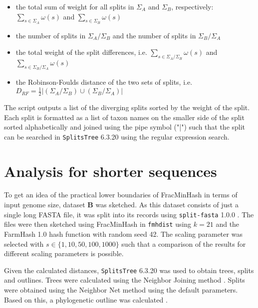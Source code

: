 \begin{itemize}
  \item the total sum of weight for all splits in $\Sigma_A$ and $\Sigma_B$,
  respectively: $\sum_{s \in \Sigma_A}{\omega(s)}$ and $\sum_{s \in
  \Sigma_B}{\omega(s)}$ 
  \item the number of splits in $\Sigma_A / \Sigma_B$ and the number of splits
  in $\Sigma_B / \Sigma_A$
  \item the total weight of the split differences, i.e.
  $\sum_{s \in \Sigma_A / \Sigma_B}{\omega(s)}$ and $\sum_{s \in \Sigma_B /
  \Sigma_A}{\omega(s)}$
  \item the Robinson-Foulds distance
  \cite{robinsonComparisonPhylogeneticTrees1981} of the two sets of splits, i.e.
  $D_{RF} = \frac{1}{2}|(\Sigma_A / \Sigma_B) \cup (\Sigma_B / \Sigma_A)|$
\end{itemize}

The script outputs a list of the diverging splits sorted by the weight of the
split. Each split is formatted as a list of taxon names on the smaller side of
the split sorted alphabetically and joined using the pipe symbol ("|") such that
the split can be searched in \texttt{SplitsTree} 6.3.20 using the regular
expression search.



\section{Analysis for shorter sequences}
To get an idea of the practical lower boundaries of FracMinHash in terms of
input genome size, dataset \textbf{B} was sketched. As this dataset consists of
just a
single long FASTA file, it was split into its records using \texttt{split-fasta}
1.0.0 \cite{vashishtSplitfasta2020}. The files were then sketched using
FracMinHash
\cite{irberLightweightCompositionalAnalysis2022,heraDerivingConfidenceIntervals2023}
in \texttt{fmhdist} using $k=21$ and the FarmHash 1.0 hash function
\cite{pikeFarmhash2014,ZeroAllocationHashing2022} with random seed 42. The
scaling parameter was selected with  $s \in \{1, 10, 50, 100, 1000\}$ such that
a comparison of the results for different scaling parameters is possible.

Given the calculated distances, \texttt{SplitsTree} 6.3.20
\cite{husonApplicationPhylogeneticNetworks2006} was used to obtain trees, splits
and outlines. Trees were calculated using the Neighbor Joining method
\cite{saitouNeighborjoiningMethodNew1987}. Splits were obtained using the
Neighbor Net method
\cite{bryantNeighborNetAgglomerativeMethod2004,bryantNeighborNetImprovedAlgorithms2023}
using the default parameters. Based on this, a phylogenetic outline was
calculated \cite{bagciMicrobialPhylogeneticContext2021}.


